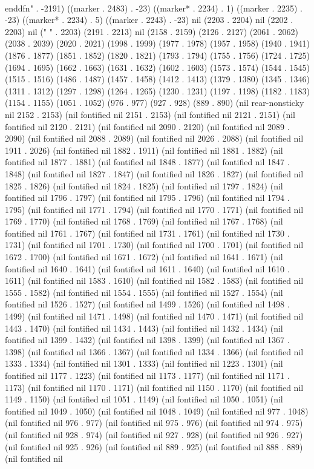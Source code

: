 \\end{dfn}" . -2191) ((marker . 2483) . -23) ((marker* . 2234) . 1) ((marker . 2235) . -23) ((marker* . 2234) . 5) ((marker . 2243) . -23) nil (2203 . 2204) nil (2202 . 2203) nil (" " . 2203) (2191 . 2213) nil (2158 . 2159) (2126 . 2127) (2061 . 2062) (2038 . 2039) (2020 . 2021) (1998 . 1999) (1977 . 1978) (1957 . 1958) (1940 . 1941) (1876 . 1877) (1851 . 1852) (1820 . 1821) (1793 . 1794) (1755 . 1756) (1724 . 1725) (1694 . 1695) (1662 . 1663) (1631 . 1632) (1602 . 1603) (1573 . 1574) (1544 . 1545) (1515 . 1516) (1486 . 1487) (1457 . 1458) (1412 . 1413) (1379 . 1380) (1345 . 1346) (1311 . 1312) (1297 . 1298) (1264 . 1265) (1230 . 1231) (1197 . 1198) (1182 . 1183) (1154 . 1155) (1051 . 1052) (976 . 977) (927 . 928) (889 . 890) (nil rear-nonsticky nil 2152 . 2153) (nil fontified nil 2151 . 2153) (nil fontified nil 2121 . 2151) (nil fontified nil 2120 . 2121) (nil fontified nil 2090 . 2120) (nil fontified nil 2089 . 2090) (nil fontified nil 2088 . 2089) (nil fontified nil 2026 . 2088) (nil fontified nil 1911 . 2026) (nil fontified nil 1882 . 1911) (nil fontified nil 1881 . 1882) (nil fontified nil 1877 . 1881) (nil fontified nil 1848 . 1877) (nil fontified nil 1847 . 1848) (nil fontified nil 1827 . 1847) (nil fontified nil 1826 . 1827) (nil fontified nil 1825 . 1826) (nil fontified nil 1824 . 1825) (nil fontified nil 1797 . 1824) (nil fontified nil 1796 . 1797) (nil fontified nil 1795 . 1796) (nil fontified nil 1794 . 1795) (nil fontified nil 1771 . 1794) (nil fontified nil 1770 . 1771) (nil fontified nil 1769 . 1770) (nil fontified nil 1768 . 1769) (nil fontified nil 1767 . 1768) (nil fontified nil 1761 . 1767) (nil fontified nil 1731 . 1761) (nil fontified nil 1730 . 1731) (nil fontified nil 1701 . 1730) (nil fontified nil 1700 . 1701) (nil fontified nil 1672 . 1700) (nil fontified nil 1671 . 1672) (nil fontified nil 1641 . 1671) (nil fontified nil 1640 . 1641) (nil fontified nil 1611 . 1640) (nil fontified nil 1610 . 1611) (nil fontified nil 1583 . 1610) (nil fontified nil 1582 . 1583) (nil fontified nil 1555 . 1582) (nil fontified nil 1554 . 1555) (nil fontified nil 1527 . 1554) (nil fontified nil 1526 . 1527) (nil fontified nil 1499 . 1526) (nil fontified nil 1498 . 1499) (nil fontified nil 1471 . 1498) (nil fontified nil 1470 . 1471) (nil fontified nil 1443 . 1470) (nil fontified nil 1434 . 1443) (nil fontified nil 1432 . 1434) (nil fontified nil 1399 . 1432) (nil fontified nil 1398 . 1399) (nil fontified nil 1367 . 1398) (nil fontified nil 1366 . 1367) (nil fontified nil 1334 . 1366) (nil fontified nil 1333 . 1334) (nil fontified nil 1301 . 1333) (nil fontified nil 1223 . 1301) (nil fontified nil 1177 . 1223) (nil fontified nil 1173 . 1177) (nil fontified nil 1171 . 1173) (nil fontified nil 1170 . 1171) (nil fontified nil 1150 . 1170) (nil fontified nil 1149 . 1150) (nil fontified nil 1051 . 1149) (nil fontified nil 1050 . 1051) (nil fontified nil 1049 . 1050) (nil fontified nil 1048 . 1049) (nil fontified nil 977 . 1048) (nil fontified nil 976 . 977) (nil fontified nil 975 . 976) (nil fontified nil 974 . 975) (nil fontified nil 928 . 974) (nil fontified nil 927 . 928) (nil fontified nil 926 . 927) (nil fontified nil 925 . 926) (nil fontified nil 889 . 925) (nil fontified nil 888 . 889) (nil fontified nil 